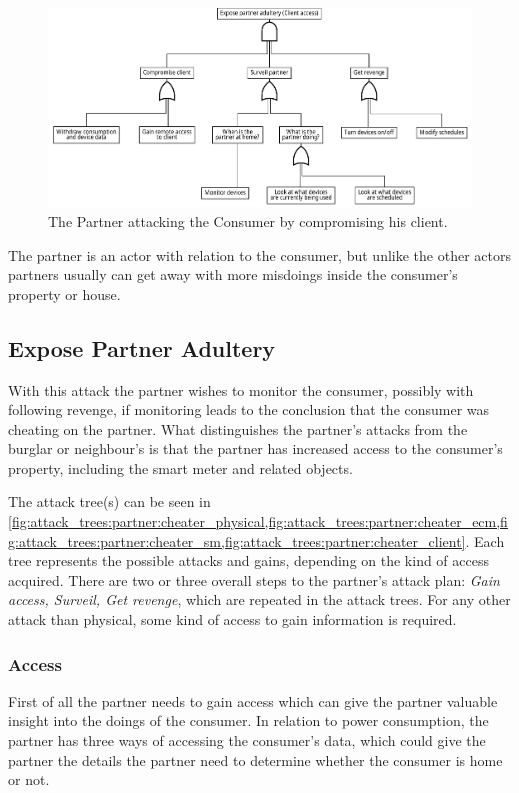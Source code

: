 \begin{figure}[h]
  \includegraphics[width=\textwidth]{figures/graphviz/partner_vs_consumer_client.pdf}
  \caption{The Partner attacking the Consumer by compromising his client.}
  \label{fig:attack_trees:partner:cheater_client}
\end{figure}

The partner is an actor with relation to the consumer, but unlike the other actors partners usually can get away with more misdoings inside the consumer's property or house.

\subsection{Expose Partner Adultery}

With this attack the partner wishes to monitor the consumer, possibly with following revenge, if monitoring leads to the conclusion that the consumer was cheating on the partner.
What distinguishes the partner's attacks from the burglar or neighbour's is that the partner has increased access to the consumer's property, including the smart meter and related objects.

The attack tree(s) can be seen in \cref{fig:attack_trees:partner:cheater_physical,fig:attack_trees:partner:cheater_ecm,fig:attack_trees:partner:cheater_sm,fig:attack_trees:partner:cheater_client}.
Each tree represents the possible attacks and gains, depending on the kind of access acquired.
There are two or three overall steps to the partner's attack plan: \textit{Gain access, Surveil, Get revenge}, which are repeated in the attack trees.
For any other attack than physical, some kind of access to gain information is required.

\subsubsection{Access}
First of all the partner needs to gain access which can give the partner valuable insight into the doings of the consumer.
In relation to power consumption, the partner has three ways of accessing the consumer's data, which could give the partner the details the partner need to determine whether the consumer is home or not.

